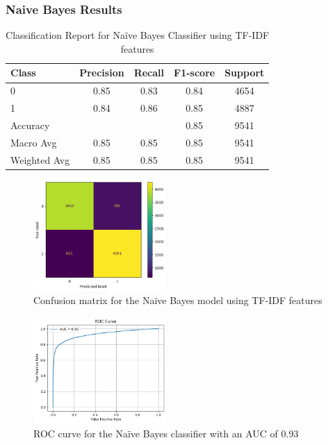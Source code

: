 \subsubsection{Naive Bayes Results}

\begin{table}[H]
\centering
\caption{Classification Report for Naïve Bayes Classifier using TF-IDF features}
\label{tab:nb_classification_report}
\begin{tabular}{lcccc}
\toprule
Class        & Precision & Recall & F1-score & Support \\
\midrule
0            & 0.85      & 0.83   & 0.84     & 4654    \\
1            & 0.84      & 0.86   & 0.85     & 4887    \\
\midrule
Accuracy     &           &        & 0.85     & 9541    \\
Macro Avg    & 0.85      & 0.85   & 0.85     & 9541    \\
Weighted Avg & 0.85      & 0.85   & 0.85     & 9541    \\
\bottomrule
\end{tabular}
\end{table}

\begin{figure}[H]
    \centering
    \includegraphics[width=0.45\textwidth]{images/confusion_matrix_nb.png}
    \caption{Confusion matrix for the Naïve Bayes model using TF-IDF features}
    \label{fig:confusion_nb}
\end{figure}

\begin{figure}[H]
    \centering
    \includegraphics[width=0.45\textwidth]{images/roc_curve_nb.png}
    \caption{ROC curve for the Naïve Bayes classifier with an AUC of 0.93}
    \label{fig:roc_nb}
\end{figure}


